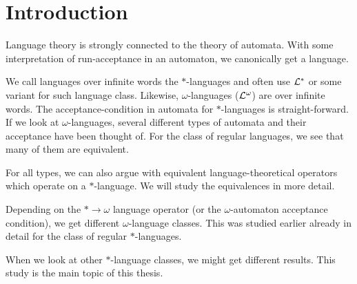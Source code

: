 \section{Introduction}

Language theory is strongly connected to the theory of automata. With some interpretation of run-acceptance in an automaton, we canonically get a language.

We call languages over infinite words the $*$-languages and often use $\mathcal{L}^*$ or some variant for such language class. Likewise, $\omega$-languages ($\mathcal{L}^\omega$) are over infinite words. The acceptance-condition in automata for $*$-languages is straight-forward. If we look at $\omega$-languages, several different types of automata and their acceptance have been thought of. For the class of regular languages, we see that many of them are equivalent.

For all types, we can also argue with equivalent language-theoretical operators which operate on a $*$-language. We will study the equivalences in more detail.

Depending on the $* \rightarrow \omega$ language operator (or the $\omega$-automaton acceptance condition), we get different $\omega$-language classes. This was studied earlier already in detail for the class of regular $*$-languages.

When we look at other $*$-language classes, we might get different results. This study is the main topic of this thesis.
